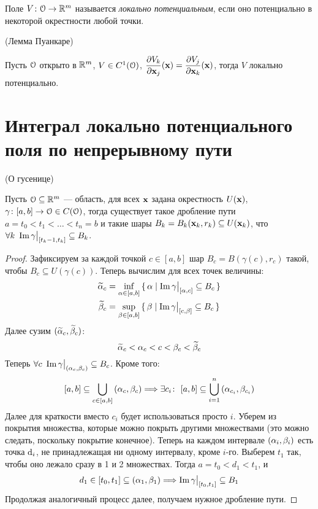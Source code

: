 \begin{definition}
    Поле $V \colon \mathcal{O} \to \mathbb{R}^m$ называется \textit{локально потенциальным}, если
    оно потенциально в некоторой окрестности любой точки.
\end{definition}

\begin{corollary}(Лемма Пуанкаре)

    Пусть $\mathcal{O}$ открыто в $\mathbb{R}^m$, $V \in C^1(\mathcal{O})$, $\dfrac{\partial V_k}{\partial \mathbf{x}_j}(\mathbf{x}) =
    \dfrac{\partial V_j}{\partial \mathbf{x}_k}(\mathbf{x})$, тогда $V$ локально потенциально.
\end{corollary}

\section{Интеграл локально потенциального поля по непрерывному пути}

\begin{lemma}(О гусенице)

    Пусть $\mathcal{O} \subseteq \mathbb{R}^m$ --- область, для всех $\mathbf{x}$ задана окрестность $U(\mathbf{x})$,
    $\gamma \colon [a, b] \to \mathcal{O} \in C(\mathcal{O})$, тогда существует такое дробление
    пути $a = t_0 < t_1 < \ldots < t_n = b$ и такие шары $B_k = B_k(\mathbf{x}_k, r_k)
    \subseteq U(\mathbf{x}_k)$, что $\forall k~ \operatorname{Im}{\gamma\big|_{[t_k - 1, t_k]}} \subseteq
    B_k$.
\end{lemma}
\begin{proof}
    Зафиксируем за каждой точкой $c \in [a, b]$ шар $B_c = B(\gamma(c), r_c)$ такой,
    чтобы $B_c \subseteq U(\gamma(c))$. Теперь вычислим для всех точек величины:
\begin{align*}
    \widetilde{\alpha}_c &= \inf_{\alpha \in [a, b]}{\{\,\alpha \mid \operatorname{Im}{\gamma\big|_{[\alpha, c]}}
            \subseteq B_c\,\}} \\
    \widetilde{\beta}_c &= \sup_{\beta \in [a, b]}{\{\,\beta \mid \operatorname{Im}{\gamma\big|_{[c, \beta]}}
            \subseteq B_c\,\}}
\end{align*}
    Далее сузим $(\widetilde{\alpha}_c, \widetilde{\beta}_c)$:
\[
    \widetilde{\alpha}_c < \alpha_c < c < \beta_c < \widetilde{\beta}_c
\]
    Теперь $\forall c~ \operatorname{Im}{\gamma\big|_{(\alpha_c, \beta_c)}} \subseteq B_c$. Кроме того:
\[
    [a, b] \subseteq \bigcup_{c \in [a, b]}{(\alpha_c, \beta_c)} \Longrightarrow
    \exists c_i\colon~ [a, b] \subseteq \bigcup_{i = 1}^{n}{(\alpha_{c_i}, \beta_{c_i})}
\]
    Далее для краткости вместо $c_i$ будет использоваться просто $i$.
    Уберем из покрытия множества, которые можно покрыть другими множествами
    (это можно следать, поскольку покрытие конечное). Теперь на каждом
    интервале $(\alpha_i, \beta_i)$ есть точка $\mathrm{d}_i$, не принадлежащая ни одному
    интервалу, кроме $i$-го. Выберем $t_1$ так, чтобы оно лежало сразу в 1 и
    2 множествах. Тогда
    $a = t_0 < d_1 < t_1$, и
\[
    d_1 \in [t_0, t_1] \subseteq (\alpha_1, \beta_1)
    \Longrightarrow \operatorname{Im}{\gamma\big|_{[t_0, t_1]}} \subseteq B_1
\]
    Продолжая аналогичный процесс далее, получаем нужное дробление пути.
\end{proof}

